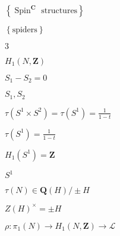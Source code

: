 \begin{preview}
\setcounter{equation}{0}%
\( \left\{ \operatorname{Spin}^{ \mathbf{C}}\text{ structures} \right\} \)
\end{preview}

\begin{preview}
\setcounter{equation}{0}%
\( \left\{ \text{spiders} \right\} \)
\end{preview}

\begin{preview}
\setcounter{equation}{0}%
\( 3 \)
\end{preview}

\begin{preview}
\setcounter{equation}{0}%
\( H_1(N , \mathbf{Z}) \)
\end{preview}

\begin{preview}
\setcounter{equation}{0}%
\( S_1 - S_2 =0  \)
\end{preview}

\begin{preview}
\setcounter{equation}{0}%
\( S_1,S_2 \)
\end{preview}

\begin{preview}
\setcounter{equation}{0}%
\( \tau(S^1 \times  S^2) = \tau(S^1) = \frac{1}{1-t} \)
\end{preview}

\begin{preview}
\setcounter{equation}{0}%
\( \tau(S^1) = \frac{1}{1-t} \)
\end{preview}

\begin{preview}
\setcounter{equation}{0}%
\(H_1(S^1) = \mathbf{Z}\)
\end{preview}

\begin{preview}
\setcounter{equation}{0}%
\( S^1  \)
\end{preview}

\begin{preview}
\setcounter{equation}{0}%
\( \tau(N)\in \mathbf{Q}(H) / \pm H  \)
\end{preview}

\begin{preview}
\setcounter{equation}{0}%
\( Z(H)^{\times } = \pm H \)
\end{preview}

\begin{preview}
\setcounter{equation}{0}%
\( \rho: \pi_1(N)\to H_1(N , \mathbf{Z}) \to \mathcal{L} \)
\end{preview}

